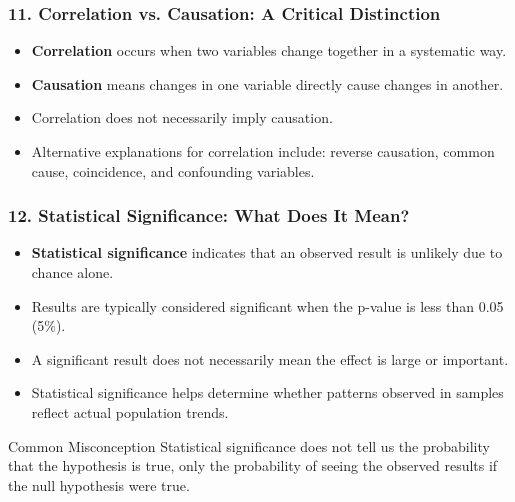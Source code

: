 \documentclass{beamer}
\begin{document}
\begin{frame}
\frametitle{11. Correlation vs. Causation: A Critical Distinction}
\begin{itemize}
\item \textbf{Correlation} occurs when two variables change together in a systematic way.
\item \textbf{Causation} means changes in one variable directly cause changes in another.
\item Correlation does not necessarily imply causation.
\item Alternative explanations for correlation include: reverse causation, common cause, coincidence, and confounding variables.
\end{itemize}

\end{frame}


\begin{frame}
\frametitle{12. Statistical Significance: What Does It Mean?}
\begin{itemize}
\item \textbf{Statistical significance} indicates that an observed result is unlikely due to chance alone.
\item Results are typically considered significant when the p-value is less than 0.05 (5\%).
\item A significant result does not necessarily mean the effect is large or important.
\item Statistical significance helps determine whether patterns observed in samples reflect actual population trends.
\end{itemize}

\begin{alertblock}{Common Misconception}
Statistical significance does not tell us the probability that the hypothesis is true, only the probability of seeing the observed results if the null hypothesis were true.
\end{alertblock}
\end{frame}
\end{document}
